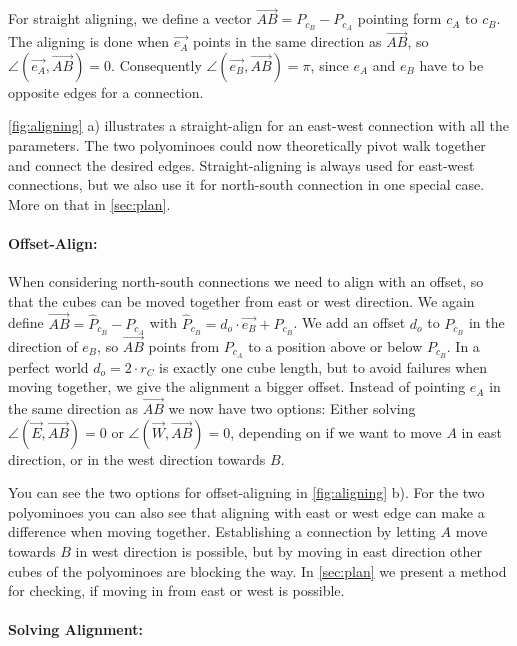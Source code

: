 For straight aligning, we define a vector $\overrightarrow{AB} = P_{c_B} - P_{c_A}$ pointing form $c_A$ to $c_B$.
The aligning is done when $\vec{e_A}$ points in the same direction as $\overrightarrow{AB}$, so $\angle \left( \vec{e_A}, \overrightarrow{AB} \right) = 0$.
Consequently $\angle \left( \vec{e_B}, \overrightarrow{AB} \right) = \pi$, since $e_A$ and $e_B$ have to be opposite edges for a connection.

\autoref{fig:aligning} a) illustrates a straight-align for an east-west connection with all the parameters.
The two polyominoes could now theoretically pivot walk together and connect the desired edges.
Straight-aligning is always used for east-west connections, but we also use it for north-south connection in one special case. More on that in \autoref{sec:plan}.

\paragraph{Offset-Align:}

When considering north-south connections we need to align with an offset, so that the cubes can be moved together from east or west direction.
We again define $\overrightarrow{AB} = \hat{P}_{c_B} - P_{c_A}$ with $\hat{P}_{c_B} = d_o \cdot \vec{e_B} + P_{c_B}$.
We add an offset $d_o$ to $P_{c_B}$ in the direction of $e_B$, so $\overrightarrow{AB}$ points from $P_{c_A}$ to a position above or below $P_{c_B}$.
In a perfect world $d_o = 2 \cdot r_C$ is exactly one cube length, but to avoid failures when moving together, we give the alignment a bigger offset.
Instead of pointing $e_A$ in the same direction as $\overrightarrow{AB}$ we now have two options:
Either solving $\angle \left( \vec{E}, \overrightarrow{AB} \right) = 0$ or $\angle \left( \vec{W}, \overrightarrow{AB} \right) = 0$, depending on if we want to move $A$ in east direction, or in the west direction towards $B$.

You can see the two options for offset-aligning in \autoref{fig:aligning} b).
For the two polyominoes you can also see that aligning with east or west edge can make a difference when moving together.
Establishing a connection by letting $A$ move towards $B$ in west direction is possible, but by moving in east direction other cubes of the polyominoes are blocking the way.
In \autoref{sec:plan} we present a method for checking, if moving in from east or west is possible. 

\paragraph{Solving Alignment:}

